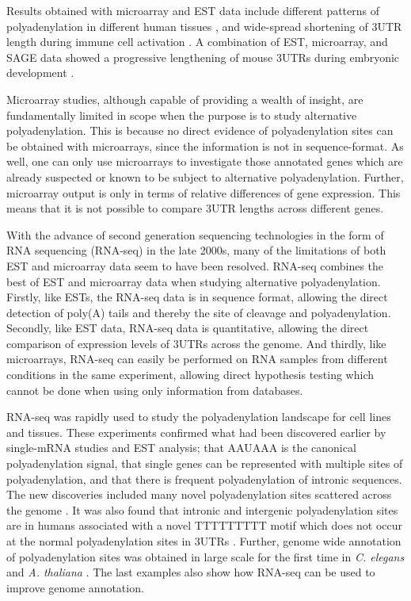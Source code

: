 Results obtained with microarray and EST data include different patterns of
polyadenylation in different human tissues \cite{zhang_biased_2005}, and
wide-spread shortening of 3\p UTR length during immune cell activation
\cite{sandberg_proliferating_2008}. A combination of EST, microarray, and SAGE
data showed a progressive lengthening of mouse 3\p UTRs during embryonic
development \cite{ji_progressive_2009}.

Microarray studies, although capable of providing a wealth of insight, are
fundamentally limited in scope when the purpose is to study alternative
polyadenylation. This is because no direct evidence of polyadenylation sites
can be obtained with microarrays, since the information is not in
sequence-format. As well, one can only use microarrays to investigate those
annotated genes which are already suspected or known to be subject to
alternative polyadenylation. Further, microarray output is only in terms of
relative differences of gene expression. This means that it is not possible to
compare 3\p UTR lengths across different genes.

With the advance of second generation sequencing technologies in the form of
RNA sequencing (RNA-seq) in the late 2000s, many of the limitations of both EST
and microarray data seem to have been resolved. RNA-seq combines the best of
EST and microarray data when studying alternative polyadenylation. Firstly,
like ESTs, the RNA-seq data is in sequence format, allowing the direct
detection of poly(A) tails and thereby the site of cleavage and
polyadenylation. Secondly, like EST data, RNA-seq data is quantitative,
allowing the direct comparison of expression levels of 3\p UTRs across the
genome. And thirdly, like microarrays, RNA-seq can easily be performed on RNA
samples from different conditions in the same experiment, allowing direct
hypothesis testing which cannot be done when using only information from
databases. 

RNA-seq was rapidly used to study the polyadenylation landscape for cell lines
and tissues. These experiments confirmed what had been discovered earlier by
single-mRNA studies and EST analysis; that AAUAAA is the canonical
polyadenylation signal, that single genes can be represented with multiple
sites of polyadenylation, and that there is frequent polyadenylation of
intronic sequences. The new discoveries included many novel polyadenylation
sites scattered across the genome \cite{ozsolak_comprehensive_2010,
derti_quantitative_2012}. It was also found that intronic and intergenic
polyadenylation sites are in humans associated with a novel TTTTTTTTT motif
which does not occur at the normal polyadenylation sites in 3\p UTRs
\cite{ozsolak_comprehensive_2010}. Further, genome wide annotation of
polyadenylation sites was obtained in large scale for the first time in
\textit{C. elegans} and \textit{A. thaliana} \cite{mangone_landscape_2010,
wu_genome-wide_2011}. The last examples also show how RNA-seq can be used to
improve genome annotation.

